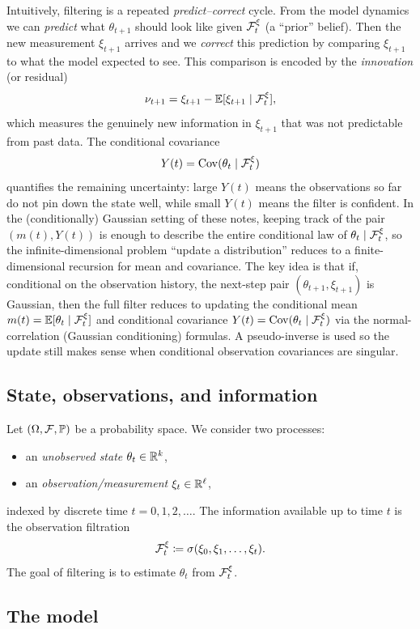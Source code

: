 Intuitively, filtering is a repeated \emph{predict--correct} cycle.
From the model dynamics we can \emph{predict} what \(\theta_{t+1}\) should look like given \(\mathcal{F}_t^\xi\) (a ``prior'' belief).
Then the new measurement \(\xi_{t+1}\) arrives and we \emph{correct} this prediction by comparing \(\xi_{t+1}\) to what the model expected to see.
This comparison is encoded by the \emph{innovation} (or residual)
\[
\nu_{t+1}=\xi_{t+1}-\mathbb{E}[\xi_{t+1}\mid \mathcal{F}_t^\xi],
\]
which measures the genuinely new information in \(\xi_{t+1}\) that was not predictable from past data.
The conditional covariance
\[
Y(t)=\mathrm{Cov}(\theta_t\mid \mathcal{F}_t^\xi)
\]
quantifies the remaining uncertainty: large \(Y(t)\) means the observations so far do not pin down the state well, while small \(Y(t)\) means the filter is confident.
In the (conditionally) Gaussian setting of these notes, keeping track of the pair \((m(t),Y(t))\) is enough to describe the entire conditional law of \(\theta_t\mid \mathcal{F}_t^\xi\), so the infinite-dimensional problem ``update a distribution'' reduces to a finite-dimensional recursion for mean and covariance. The key idea is that if, conditional on the observation
history, the next-step pair \((\theta_{t+1},\xi_{t+1})\) is Gaussian, then the full filter reduces to
updating the conditional mean \(m(t)=\mathbb{E}[\theta_t\mid \mathcal{F}_t^\xi]\) and conditional covariance
\(Y(t)=\mathrm{Cov}(\theta_t\mid \mathcal{F}_t^\xi)\) via the normal-correlation (Gaussian conditioning) formulas.
A pseudo-inverse is used so the update still makes sense when conditional observation covariances are singular.


\subsection{State, observations, and information}
Let \((\Omega,\mathcal{F},\mathbb{P})\) be a probability space.
We consider two processes:
\begin{itemize}
  \item an \emph{unobserved state} \(\theta_t\in\mathbb{R}^k\),
  \item an \emph{observation/measurement} \(\xi_t\in\mathbb{R}^\ell\),
\end{itemize}
indexed by discrete time \(t=0,1,2,\dots\).
The information available up to time \(t\) is the observation filtration
\[
\mathcal{F}_t^\xi \coloneqq \sigma(\xi_0,\xi_1,\dots,\xi_t).
\]
The goal of filtering is to estimate \(\theta_t\) from \(\mathcal{F}_t^\xi\).

\subsection{The model}


